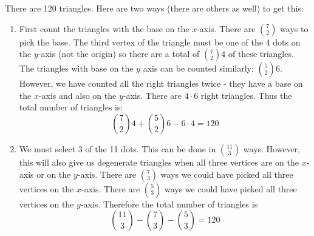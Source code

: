 \documentclass[11pt]{exam}
\begin{document}
\begin{questions}
\begin{center}
\end{center}

\begin{solution}
  There are 120 triangles.  Here are two ways (there are others as well) to get this:
  
  \begin{enumerate}
    \item First count the triangles with the base on the $x$-axis.  There are ${7 \choose 2}$ ways to pick the base.  The third vertex of the triangle must be one of the 4 dots on the $y$-axis (not the origin) so there are a total of ${7 \choose 2}4$ of these triangles.  The triangles with base on the $y$ axis can be counted similarly: ${5 \choose 2}6$.  However, we have counted all the right triangles twice - they have a base on the $x$-axis and also on the $y$-axis.  There are $4 \cdot 6$ right triangles.  Thus the total number of triangles is:
    \[{7 \choose 2}4 + {5 \choose 2}6 - 6\cdot 4 = 120\]
    \item We must select 3 of the 11 dots.  This can be done in ${11 \choose 3}$ ways.  However, this will also give us degenerate triangles when all three vertices are on the $x$-axis or on the $y$-axis.  There are ${7 \choose 3}$ ways we could have picked all three vertices on the $x$-axis.  There are ${5 \choose 3}$ ways we could have picked all three vertices on the $y$-axis.  Therefore the total number of triangles is
    \[{11 \choose 3} - {7 \choose 3} - {5 \choose 3} = 120\]
  \end{enumerate}

\end{solution}
\end{questions}
\end{document}
